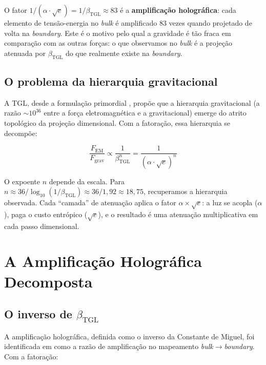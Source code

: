 \documentclass[12pt,a4paper,twoside]{article}
\newcommand{\betatgl}{\beta_{\!\scriptscriptstyle\mathrm{TGL}}}
\newcommand{\boundary}{\textit{boundary}}
\newcommand{\bulk}{\textit{bulk}}
\begin{document}
O fator $1/(\alpha \cdot \sqrt{e}) = 1/\betatgl \approx 83$ é a \textbf{amplificação holográfica}: cada elemento de tensão-energia no \bulk{} é amplificado 83 vezes quando projetado de volta na \boundary. Este é o motivo pelo qual a gravidade é tão fraca em comparação com as outras forças: o que observamos no \bulk{} é a projeção atenuada por $\betatgl$ do que realmente existe na \boundary.

\subsection{O problema da hierarquia gravitacional}

A TGL, desde a formulação primordial \cite{Miguel2026Fronteira}, propõe que a hierarquia gravitacional (a razão $\sim 10^{36}$ entre a força eletromagnética e a gravitacional) emerge do atrito topológico da projeção dimensional. Com a fatoração, essa hierarquia se decompõe:

\begin{equation}
\frac{F_{\text{EM}}}{F_{\text{grav}}} \propto \frac{1}{\betatgl^n} = \frac{1}{(\alpha \cdot \sqrt{e})^n}
\end{equation}

O expoente $n$ depende da escala. Para $n \approx 36/\log_{10}(1/\betatgl) \approx 36/1{,}92 \approx 18{,}75$, recuperamos a hierarquia observada. Cada ``camada'' de atenuação aplica o fator $\alpha \times \sqrt{e}$: a luz se acopla ($\alpha$), paga o custo entrópico ($\sqrt{e}$), e o resultado é uma atenuação multiplicativa em cada passo dimensional.



\section{A Amplificação Holográfica Decomposta}
\label{sec:amplificacao}

\subsection{O inverso de $\betatgl$}

A amplificação holográfica, definida como o inverso da Constante de Miguel, foi identificada em \cite{Miguel2026Fronteira} como a razão de amplificação no mapeamento \bulk$\to$\boundary. Com a fatoração:
\end{document}
